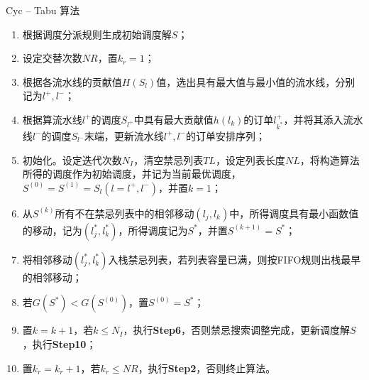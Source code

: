 \documentclass{beamer}
\newcommand{\Step}[1]{\textbf{Step#1}}
\begin{document}
\begin{frame}
{\begin{exampleblock}{Cyc -- Tabu 算法}
\begin{enumerate}[\bf Step1]
\item 根据调度分派规则生成初始调度解$S$；
\item 设定交替次数$NR$，置$k_r = 1$；
\item 根据各流水线的贡献值$H(S_l)$值，选出具有最大值与最小值的流水线，分别记为$l^+, l^-$；
\item 根据算流水线$l^+$的调度$S_{l^+}$中具有最大贡献值$h(l_k)$的订单$l^+_{k^*}$，并将其添入流水线$l^-$的调度$S_{l^-}$末端，更新流水线$l^+, l^-$的订单安排序列；
\item 初始化。设定迭代次数$N_I$，清空禁忌列表$TL$，设定列表长度$NL$，将构造算法所得的调度作为初始调度，并记为当前最优调度，$S^{(0)} = S^{(1)} = S_l(l = l^+, l^-)$，并置$k = 1$；
\item 从$S^{(k)}$所有不在禁忌列表中的相邻移动$(l_j,l_k)$中，所得调度具有最小函数值的移动，记为$(l_j^*, l_k^*)$，所得调度记为$S^*$，并置$S^{(k+1)} = S^*$；
\item 将相邻移动$(l_j^*, l_k^*)$入栈禁忌列表，若列表容量已满，则按FIFO规则出栈最早的相邻移动；
\item 若$G(S^*) < G(S^{(0)})$，置$S^{(0)} = S^*$；
\item 置$k = k + 1$，若$k\le N_I$，执行\Step{6}，否则禁忌搜索调整完成，更新调度解$S$，执行\Step{10}；
\item 置$k_r = k_r + 1$，若$k_r\le NR$，执行\Step{2}，否则终止算法。
\end{enumerate}
\end{exampleblock}}
\end{frame}

\end{document}
